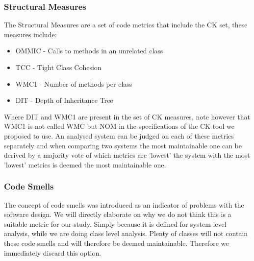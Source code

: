 \subsubsection{Structural Measures}
The Structural Measures are a set of code metrics that include the CK set, these measures include:
\begin{itemize}
    \item OMMIC - Calls to methods in an unrelated class
    \item TCC - Tight Class Cohesion
    \item WMC1 - Number of methods per class
    \item DIT - Depth of Inheritance Tree
\end{itemize}
Where DIT and WMC1 are present in the set of CK measures, note however that WMC1 is not called WMC but NOM in the specifications of the CK tool we proposed to use. An analysed system can be judged on each of these metrics separately and when comparing two systems the most maintainable one can be derived by a majority vote of which metrics are 'lowest' the system with the most 'lowest' metrics is deemed the most maintainable one.
\subsubsection{Code Smells}
The concept of code smells was introduced as an indicator of problems with the software design\cite{sjoberg2012questioning}. We will directly elaborate on why we do not think this is a suitable metric for our study. Simply because it is defined for system level analysis, while we are doing class level analysis. Plenty of classes will not contain these code smells and will therefore be deemed maintainable. Therefore we immediately discard this option.
